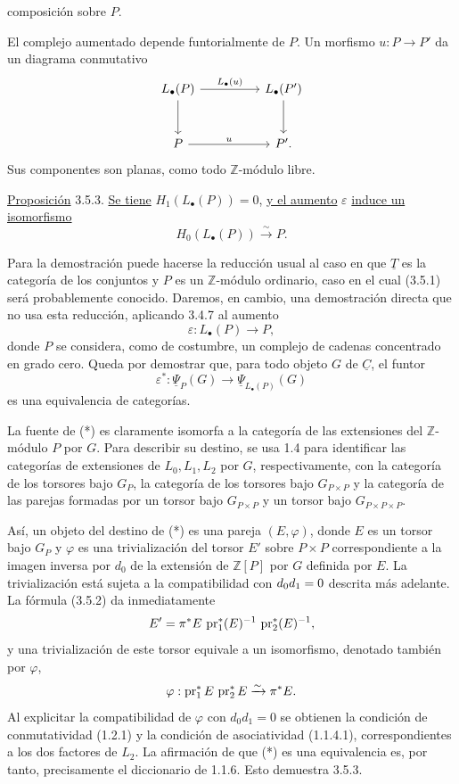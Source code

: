 
composición sobre $P$.

El complejo aumentado depende funtorialmente de $P$. Un morfismo
$u:P\longrightarrow P'$ da un diagrama conmutativo
\[
\begin{tikzcd}[column sep=huge,row sep=large]
 L_\bullet(P)\arrow[r,"L_\bullet(u)"]\arrow[d]
 &L_\bullet(P')\arrow[d]\\
 P\arrow[r,"u"]&P'.
\end{tikzcd}
\]
Sus componentes son planas, como todo $\mathbb Z$-módulo libre.

\underline{Proposición} 3.5.3. \underline{Se tiene}
$H_1(L_\bullet(P))=0$, \underline{y el aumento} $\varepsilon$
\underline{induce un isomorfismo}
\[
 H_0(L_\bullet(P))\xrightarrow{\sim}P.
\]

Para la demostración puede hacerse la reducción usual al caso en que
$\underline T$ es la categoría de los conjuntos y $P$ es un
$\mathbb Z$-módulo ordinario, caso en el cual (3.5.1) será probablemente
conocido. Daremos, en cambio, una demostración directa que no usa esta
reducción, aplicando 3.4.7 al aumento
\[
 \varepsilon:L_\bullet(P)\longrightarrow P,
\]
donde $P$ se considera, como de costumbre, un complejo de cadenas
concentrado en grado cero. Queda por demostrar que, para todo objeto $G$
de $\underline C$, el funtor
\begin{equation}\tag{*}
 \varepsilon^*:\underline\Psi_P(G)\longrightarrow
 \underline\Psi_{L_\bullet(P)}(G)
\end{equation}
es una equivalencia de categorías.


La fuente de (*) es claramente isomorfa a la categoría de las extensiones
del $\mathbb Z$-módulo $P$ por $G$. Para describir su destino, se usa 1.4
para identificar las categorías de extensiones de $L_0,L_1,L_2$ por $G$,
respectivamente, con la categoría de los torsores bajo $G_P$, la categoría
de los torsores bajo $G_{P\times P}$ y la categoría de las parejas formadas
por un torsor bajo $G_{P\times P}$ y un torsor bajo
$G_{P\times P\times P}$.

Así, un objeto del destino de (*) es una pareja $(E,\varphi)$, donde $E$
es un torsor bajo $G_P$ y $\varphi$ es una trivialización del torsor $E'$
sobre $P\times P$ correspondiente a la imagen inversa por $d_0$ de la
extensión de $\mathbb Z[P]$ por $G$ definida por $E$. La trivialización
está sujeta a la compatibilidad con $\sisi{d_1d_0}{d_0d_1}=0$ descrita
más adelante. La fórmula (3.5.2) da inmediatamente
\[
 E'=\pi^*E\,\pr_1^*(E)^{-1}\,\pr_2^*(E)^{-1},
\]
y una trivialización de este torsor equivale a un isomorfismo, denotado
también por $\varphi$,
\[
 \varphi:\pr_1^*E\,\pr_2^*E\xrightarrow{\sim}\pi^*E.
\]
Al explicitar la compatibilidad de $\varphi$ con $d_0d_1=0$ se obtienen
la condición de conmutatividad (1.2.1) y la condición de asociatividad
(1.1.4.1), correspondientes a los dos factores de $L_2$. La afirmación
de que (*) es una equivalencia es, por tanto, precisamente el diccionario
de 1.1.6. Esto demuestra 3.5.3.

